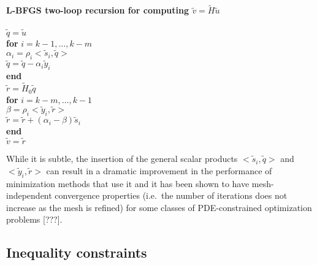 \documentclass[pdf,ps2pdf,11pt]{SANDreport}
\begin{document}
\bifthen
\textbf{L-BFGS two-loop recursion for computing $\tilde{v} = \tilde{H} \tilde{u}$} \\
\\
$\tilde{q} = \tilde{u}$ \\
\textbf{for} $i = k-1, \ldots , k-m$ \\
\> $\alpha_i = \rho_i <\tilde{s}_i,\tilde{q}>$ \\
\> $\tilde{q} = \tilde{q} - \alpha_i \tilde{y}_i$ \\
\textbf{end} \\
$\tilde{r} = \tilde{H}_0 \tilde{q}$ \\
\textbf{for} $i = k-m, \ldots , k-1$ \\
\> $\beta = \rho_i <\tilde{y}_i,\tilde{r}>$ \\
\> $\tilde{r} = \tilde{r} + (\alpha_i - \beta) \tilde{s}_i$ \\
\textbf{end} \\
$\tilde{v} = \tilde{r}$
\eifthen

While it is subtle, the insertion of the general scalar products
$<\tilde{s}_i,\tilde{q}>$ and $<\tilde{y}_i,\tilde{r}>$ can result in a
dramatic improvement in the performance of minimization methods that use it
and it has been shown to have mesh-independent convergence properties (i.e.\
the number of iterations does not increase as the mesh is refined) for some
classes of PDE-constrained optimization problems [???].

\subsection{Inequality constraints}
\end{document}
